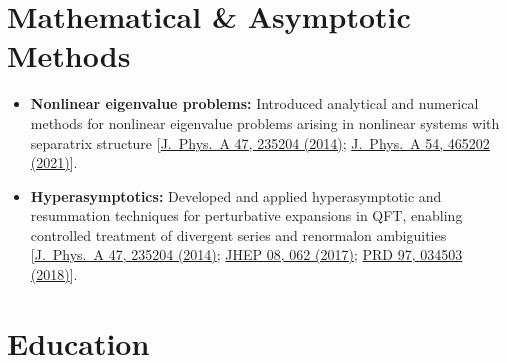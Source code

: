 \documentclass[12pt,a4paper,sans]{moderncv}
\begin{document}
\section{Mathematical \& Asymptotic Methods}

\begin{itemize}

\item \textbf{Nonlinear eigenvalue problems:}
Introduced analytical and numerical methods for nonlinear eigenvalue problems arising in nonlinear systems with separatrix structure
[\href{https://doi.org/10.1088/1751-8113/47/23/235204}{J.~Phys.~A 47, 235204 (2014)};
\href{https://doi.org/10.1088/1751-8121/ac2e29}{J.~Phys.~A 54, 465202 (2021)}].

\item \textbf{Hyperasymptotics:}
Developed and applied hyperasymptotic and resummation techniques for perturbative expansions in QFT, enabling controlled treatment of divergent series and renormalon ambiguities
[\href{https://doi.org/10.1088/1751-8113/47/23/235204}{J.~Phys.~A 47, 235204 (2014)};
\href{https://doi.org/10.1007/JHEP08(2017)062}{JHEP 08, 062 (2017)};
\href{https://doi.org/10.1103/PhysRevD.97.034503}{PRD 97, 034503 (2018)}].


\end{itemize}

\section{Education}

\end{document}
